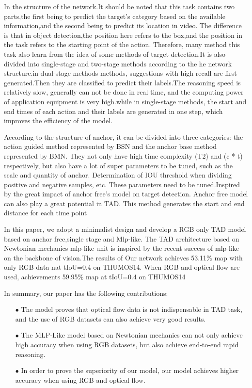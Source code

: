 \documentclass[10pt,twocolumn,letterpaper]{article}
\begin{document}
In the structure of the network.It should be noted that this task contains two parts,the first being to predict the target's category based on the available information,and the second being to predict its location in video. The difference is that in object detection,the position here refers to the box,and the position in the task refers to the starting point of the action. Therefore, many method this task also learn from the idea of some methods of target detection.It is also divided into single-stage and two-stage methods according to the he network structure.in dual-stage methods methods, suggestions with high recall are first generated.Then they are classified to predict their labels.The reasoning speed is relatively slow, generally can not be done in real time, and the computing power of application equipment is very high.while in single-stage methods, the start and end times of each action and their labels are generated in one step, which improves the efficiency of the model.

According to the structure of anchor, it can be divided into three categories: the action guided method represented by BSN\cite{lin2018bsn} and the anchor base method represented by BMN\cite{lin2019bmn}. They not only have high time complexity (T2) and (c * t) respectively, but also have a lot of super parameters to be tuned, such as the scale and quantity of anchor. Determination of IOU threshold when dividing positive and negative samples, etc. These parameters need to be tuned.Inspired by the great impact of anchor free's model on target detection. Anchor free model can also play a great potential in TAD. This method generates the start and end distance for each time point

In this paper, we adopt a minimalist design and develop a RGB only TAD model based on anchor free,single stage and Mlp-like. The TAD architecture based on Newtonian mechanics mlp-like unit is inspired by the recent success of mlp-like on the backbone of vision.The results of  Our network achieves 53.11\% map with only RGB data nat tIoU=0.4 on THUMOS14. When RGB and optical flow are used, achievements 59.95\% map
at tIoU=0.4 on THUMOS14

In summary, our paper has the following contributions:
\begin{itemize}
    \item[$\bullet$]The model proves that optical flow data is not indispensable in TAD task, and the use of RGB datasets can also achieve very good results.
    \item[$\bullet$]The MLP-Like model based on Newtonian mechanics can not only achieve high accuracy when using RGB datasets, but also achieve end-to-end rapid reasoning.
    \item[$\bullet$]In order to prove the superiority of our model, our model achieves higher accuracy when using RGB and optical flow.
\end{itemize}
\end{document}
